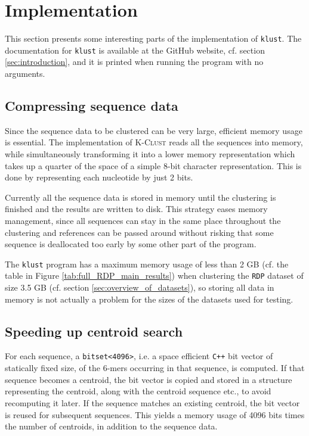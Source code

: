 \section{Implementation} \label{sec:implementation}

This section presents some interesting parts of the implementation of
\texttt{klust}. The documentation for \texttt{klust} is available at the GitHub
website, cf.  section \ref{sec:introduction}, and it is printed when running
the program with no arguments.


\subsection{Compressing sequence data}

Since the sequence data to be clustered can be very large, efficient memory
usage is essential. The implementation of \textsc{K-Clust} reads all the
sequences into memory, while simultaneously transforming it into a lower memory
representation which takes up a quarter of the space of a simple 8-bit
character representation. This is done by representing each nucleotide by just
2 bits.

Currently all the sequence data is stored in memory until the clustering is
finished and the results are written to disk. This strategy eases memory
management, since all sequences can stay in the same place throughout the
clustering and references can be passed around without risking that some
sequence is deallocated too early by some other part of the program.

The \texttt{klust} program has a maximum memory usage of less than 2 GB (cf.
the table in Figure \ref{tab:full_RDP_main_results}) when clustering the
\texttt{RDP} dataset of size 3.5 GB (cf. section
\ref{sec:overview_of_datasets}), so storing all data in memory is not actually
a problem for the sizes of the datasets used for testing.


\subsection{Speeding up centroid search}

For each sequence, a \verb|bitset<4096>|, i.e. a space efficient \texttt{C++}
bit vector of statically fixed size, of the $6$-mers occurring in that
sequence, is computed. If that sequence becomes a centroid, the bit vector is
copied and stored in a structure representing the centroid, along with the
centroid sequence etc., to avoid recomputing it later. If the sequence matches
an existing centroid, the bit vector is reused for subsequent sequences. This
yields a memory usage of 4096 bits times the number of centroids, in addition
to the sequence data.

